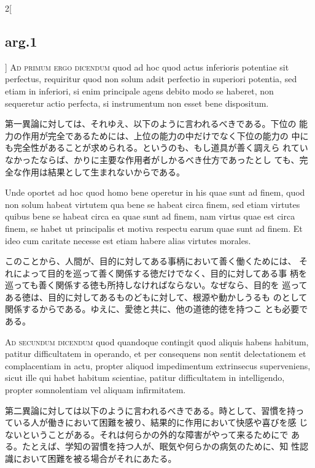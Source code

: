 \documentclass[paper=a4paper,fontsize=10pt,jafontsize=9pt,titlepage]{jlreq}
\begin{document}
\begin{paracol}{2}[\subsection{arg.1}]
{\scshape Ad primum ergo dicendum} quod ad hoc quod actus inferioris
 potentiae sit perfectus, requiritur quod non solum adsit perfectio in
 superiori potentia, sed etiam in inferiori, si enim principale agens
 debito modo se haberet, non sequeretur actio perfecta, si
 instrumentum non esset bene dispositum.

\switchcolumn

第一異論に対しては、それゆえ、以下のように言われるべきである。下位の
 能力の作用が完全であるためには、上位の能力の中だけでなく下位の能力の
 中にも完全性があることが求められる。というのも、もし道具が善く調えら
 れていなかったならば、かりに主要な作用者がしかるべき仕方であったとし
 ても、完全な作用は結果として生まれないからである。

\switchcolumn*

Unde oportet ad hoc quod homo bene operetur in his quae sunt ad
 finem, quod non solum habeat virtutem qua bene se habeat circa finem,
 sed etiam virtutes quibus bene se habeat circa ea quae sunt ad finem,
 nam virtus quae est circa finem, se habet ut principalis et motiva
 respectu earum quae sunt ad finem. Et ideo cum caritate necesse est
 etiam habere alias virtutes morales.

\switchcolumn

このことから、人間が、目的に対してある事柄において善く働くためには、
 それによって目的を巡って善く関係する徳だけでなく、目的に対してある事
 柄を巡っても善く関係する徳も所持しなければならない。なぜなら、目的を
 巡ってある徳は、目的に対してあるものどもに対して、根源や動かしうるも
 のとして関係するからである。ゆえに、愛徳と共に、他の道徳的徳を持つこ
 とも必要である。

\switchcolumn*[\subsection{ad.2}]

{\scshape Ad secundum dicendum} quod quandoque contingit quod aliquis
 habens habitum, patitur difficultatem in operando, et per consequens
 non sentit delectationem et complacentiam in actu, propter aliquod
 impedimentum extrinsecus superveniens, sicut ille qui habet habitum
 scientiae, patitur difficultatem in intelligendo, propter
 somnolentiam vel aliquam infirmitatem.

\switchcolumn

第二異論に対しては以下のように言われるべきである。時として、習慣を持っ
 ている人が働きにおいて困難を被り、結果的に作用において快感や喜びを感
 じないということがある。それは何らかの外的な障害がやって来るためにで
 ある。たとえば、学知の習慣を持つ人が、眠気や何らかの病気のために、知
 性認識において困難を被る場合がそれにあたる。


\end{paracol}
\end{document}
